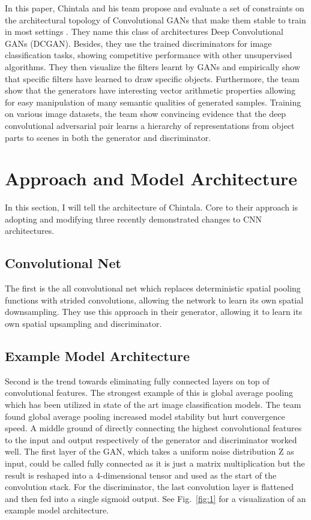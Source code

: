 \documentclass[10pt,twocolumn,letterpaper]{article}
\begin{document}
In this paper, Chintala and his team propose and evaluate a set of constraints on the architectural topology of Convolutional GANs that make them stable to train in most settings \cite{Radford2015Unsupervised}. They name this class of architectures Deep Convolutional GANs (DCGAN). Besides, they use the trained discriminators for image classification tasks, showing competitive performance with other unsupervised algorithms. They then visualize the filters learnt by GANs and empirically show that specific filters have learned to draw specific objects. Furthermore, the team show that the generators have interesting vector arithmetic properties allowing for easy manipulation of many semantic qualities of generated samples. Training on various image datasets, the team show convincing evidence that the deep convolutional adversarial pair learns a hierarchy of representations from object parts to scenes in both the generator and discriminator.

\section{Approach and Model Architecture}

In this section, I will tell the architecture of Chintala. Core to their approach is adopting and modifying three recently demonstrated changes to CNN architectures.

\subsection{Convolutional Net}

The first is the all convolutional net \cite{Springenberg2014Striving} which replaces deterministic spatial pooling functions with strided convolutions, allowing the network to learn its own spatial downsampling. They use this approach in their generator, allowing it to learn its own spatial upsampling and discriminator.

\subsection{Example Model Architecture}

Second is the trend towards eliminating fully connected layers on top of convolutional features. The strongest example of this is global average pooling which has been utilized in state of the art image classification models. The team found global average pooling increased model stability but hurt convergence speed. A middle ground of directly connecting the highest convolutional features to the input and output respectively of the generator and discriminator worked well. The first layer of the GAN, which takes a uniform noise distribution Z as input, could be called fully connected as it is just a matrix multiplication but the result is reshaped into a 4-dimensional tensor and used as the start of the convolution stack. For the discriminator, the last convolution layer is flattened and then fed into a single sigmoid output. See Fig.~\ref{fig:1} for a visualization of an example model architecture.
\end{document}
